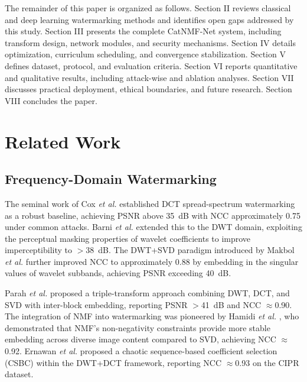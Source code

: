 \documentclass[journal]{IEEEtran}
\begin{document}
The remainder of this paper is organized as follows. Section II reviews
classical and deep learning watermarking methods and identifies open
gaps addressed by this study. Section III presents the complete CatNMF-Net
system, including transform design, network modules, and security
mechanisms. Section IV details optimization, curriculum scheduling, and
convergence stabilization. Section V defines dataset, protocol, and
evaluation criteria. Section VI reports quantitative and qualitative
results, including attack-wise and ablation analyses. Section VII
discusses practical deployment, ethical boundaries, and future research.
Section VIII concludes the paper.

\section{Related Work}

\subsection{Frequency-Domain Watermarking}

The seminal work of Cox \textit{et al.} \cite{cox1997secure} established
DCT spread-spectrum watermarking as a robust baseline, achieving PSNR
above 35~dB with NCC approximately 0.75 under common attacks. Barni
\textit{et al.} \cite{barni1998dct} extended this to the DWT domain,
exploiting the perceptual masking properties of wavelet coefficients to
improve imperceptibility to $>$38~dB. The DWT+SVD paradigm introduced
by Makbol \textit{et al.} \cite{makbol2013robust} further improved NCC
to approximately 0.88 by embedding in the singular values of wavelet
subbands, achieving PSNR exceeding 40~dB.

Parah \textit{et al.} \cite{parah2016hiding} proposed a triple-transform
approach combining DWT, DCT, and SVD with inter-block embedding, reporting
PSNR $>$41~dB and NCC $\approx$0.90. The integration of NMF into
watermarking was pioneered by Hamidi \textit{et al.}
\cite{hamidi2018hybrid}, who demonstrated that NMF's non-negativity
constraints provide more stable embedding across diverse image content
compared to SVD, achieving NCC $\approx$0.92. Ernawan \textit{et al.}
\cite{ernawan2020robust} proposed a chaotic sequence-based coefficient
selection (CSBC) within the DWT+DCT framework, reporting NCC $\approx$0.93
on the CIPR dataset.
\end{document}
